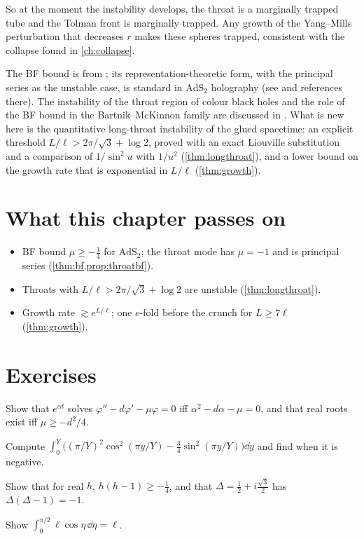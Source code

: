 So at the moment the instability develops, the throat is a marginally trapped tube and the Tolman front is marginally trapped. Any growth of the Yang--Mills perturbation that decreases $r$ makes these spheres trapped, consistent with the collapse found in \cref{ch:collapse}.

\begin{litbox}
The BF bound is from \cite{BreitenlohnerFreedman1982}; its representation-theoretic form, with the principal series as the unstable case, is standard in $\mathrm{AdS}_2$ holography (see \cite{Spradlin1999} and references there). The instability of the throat region of colour black holes and the role of the BF bound in the Bartnik--McKinnon family are discussed in \cite{VolkovGaltsov1999}. What is new here is the quantitative long-throat instability of the glued spacetime: an explicit threshold $L/\ell>2\pi/\sqrt3+\log2$, proved with an exact Liouville substitution and a comparison of $1/\sin^2u$ with $1/u^2$ (\cref{thm:longthroat}), and a lower bound on the growth rate that is exponential in $L/\ell$ (\cref{thm:growth}).
\end{litbox}

\section*{What this chapter passes on}
\begin{itemize}[nosep]
\item BF bound $\mu\ge-\frac14$ for $\mathrm{AdS}_2$; the throat mode has $\mu=-1$ and is principal series (\cref{thm:bf,prop:throatbf}).
\item Throats with $L/\ell>2\pi/\sqrt3+\log2$ are unstable (\cref{thm:longthroat}).
\item Growth rate $\gtrsim e^{L/\ell}$; one $e$-fold before the crunch for $L\ge7\ell$ (\cref{thm:growth}).
\end{itemize}

\section*{Exercises}
\begin{exercise}
Show that $e^{\alpha t}$ solves $\varphi''-d\varphi'-\mu\varphi=0$ iff $\alpha^2-d\alpha-\mu=0$, and that real roots exist iff $\mu\ge-d^2/4$.
\end{exercise}
\begin{exercise}
Compute $\int_0^Y\bigl((\pi/Y)^2\cos^2(\pi y/Y)-\frac34\sin^2(\pi y/Y)\bigr)\dd y$ and find when it is negative.
\end{exercise}
\begin{exercise}
Show that for real $h$, $h(h-1)\ge-\frac14$, and that $\Delta=\frac12+i\frac{\sqrt3}2$ has $\Delta(\Delta-1)=-1$.
\end{exercise}
\begin{exercise}
Show $\int_0^{\pi/2}\ell\cos\eta\,\dd\eta=\ell$.
\end{exercise}

